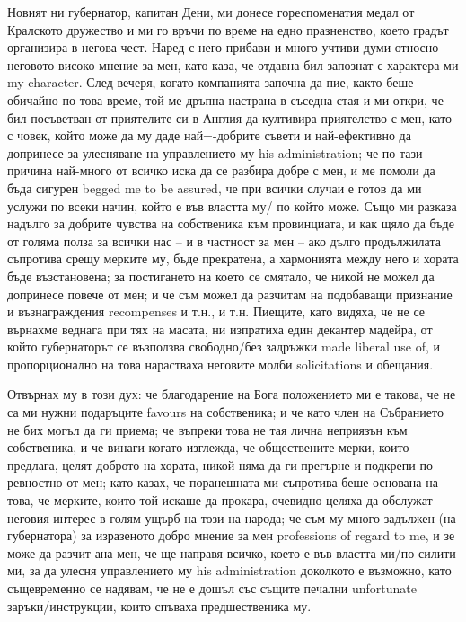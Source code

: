 \documentclass[12pt]{book}
\begin{document}
Новият ни губернатор, капитан Дени, ми донесе гореспоменатия медал от Кралското дружество и ми го връчи по време на едно празненство, което градът организира в негова чест. Наред с него прибави и много учтиви думи относно неговото високо мнение за мен, като каза, че отдавна бил запознат с характера ми my character. След вечеря, когато компанията започна да пие, както беше обичайно по това време, той ме дръпна настрана в съседна стая и ми откри, че бил посъветван от приятелите си в Англия да култивира приятелство с мен, като с човек, който може да му даде най=-добрите съвети и най-ефективно да допринесе за улесняване на управлението му his administration; че по тази причина най-много от всичко иска да се разбира добре с мен, и ме помоли да бъда сигурен begged me to be assured, че при всички случаи е готов да ми услужи по всеки начин, който е във властта му/ по който може. Също ми разказа надълго за добрите чувства на собственика към провинциата, и как щяло да бъде от голяма полза за всички нас – и в частност за мен – ако дълго продължилата съпротива срещу мерките му, бъде прекратена, а хармонията между него и хората бъде възстановена; за постигането на което се смятало, че никой не можел да допринесе повече от мен; и че съм можел да разчитам на подобаващи признание и възнаграждения recompenses и т.н., и т.н. Пиещите, като видяха, че не се върнахме веднага при тях на масата, ни изпратиха един декантер мадейра, от който губернаторът се възползва свободно/без задръжки made liberal use of, и пропорционално на това нарастваха неговите молби solicitations и обещания.

Отвърнах му в този дух: че благодарение на Бога положението ми е такова, че не са ми нужни подаръците favours на собственика; и че като член на Събранието не бих могъл да ги приема; че въпреки това не тая лична неприязън към собственика, и че винаги когато изглежда, че обществените мерки, които предлага, целят доброто на хората, никой няма да ги прегърне и подкрепи по ревностно от мен; като казах, че поранешната  ми съпротива беше основана на това, че мерките, които той искаше да прокара, очевидно целяха да обслужат неговия интерес в голям ущърб на този на народа; че съм му много задължен (на губернатора) за изразеното добро мнение за мен professions of regard to me, и зе може да разчит ана мен, че ще направя всичко, което е във властта ми/по силити ми, за да улесня управлението му his administration доколкото е възможно, като същевременно се надявам, че не е дошъл със същите печални unfortunate заръки/инструкции, които спъваха предшественика му.
\end{document}

